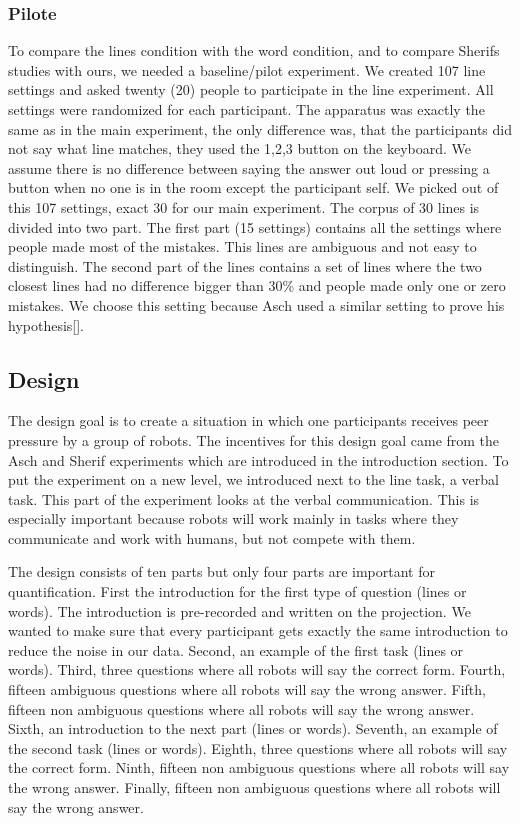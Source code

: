 \documentclass{acm_proc_article-sp}
\begin{document}
\subsubsection{Pilote}
To compare the lines condition with the word condition, and to compare Sherifs studies with ours, we needed a baseline/pilot experiment. We created 107 line settings and asked twenty (20) people to participate in the line experiment. All settings were randomized for each participant. The apparatus was exactly the same as in the main experiment, the only difference was, that the participants did not say what line matches, they used the 1,2,3 button on the keyboard. We assume there is no difference between saying the answer out loud or pressing a button when no one is in the room except the participant self. We picked out of this 107 settings, exact 30 for our main experiment. The corpus of 30 lines is divided into two part. The first part (15 settings) contains all the settings where people made most of the mistakes. This lines are ambiguous and not easy to distinguish. The second part of the lines contains a set of lines where the two closest lines had no difference bigger than 30\% and people made only one or zero mistakes. We choose this setting because Asch used a similar setting to prove his hypothesis[]. 

\subsection{Design}
The design goal is to create a situation in which one participants receives peer pressure by a group of robots. The incentives for this design goal came from the Asch and Sherif experiments which are introduced in the introduction section. To put the experiment on a new level, we introduced next to the line task, a verbal task. This part of the experiment looks at the verbal communication. This is especially important because robots will work mainly in tasks where they communicate and work with humans, but not compete with them. 

The design consists of ten parts but only four parts are important for quantification. First the introduction for the first type of question (lines or words). The introduction is pre-recorded and written on the projection. We wanted to make sure that every participant gets exactly the same introduction to reduce the noise in our data. Second, an example of the first task (lines or words). Third, three questions where all robots will say the correct form. Fourth, fifteen ambiguous questions where all robots will say the wrong answer. Fifth, fifteen non ambiguous questions where all robots will say the wrong answer. Sixth, an introduction to the next part (lines or words). Seventh, an example of the second task (lines or words). Eighth, three questions where all robots will say the correct form. Ninth, fifteen non ambiguous questions where all robots will say the wrong answer. Finally, fifteen non ambiguous questions where all robots will say the wrong answer.
\end{document}
